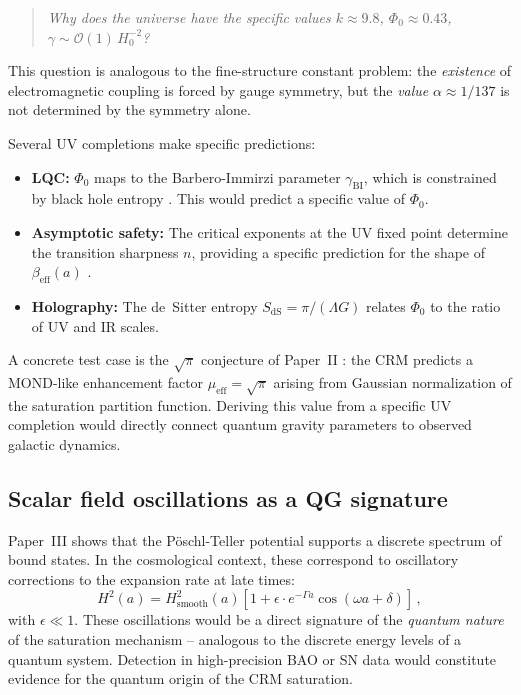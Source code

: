 \documentclass[aps,prd,twocolumn,superscriptaddress,nofootinbib]{revtex4-2}
\begin{document}
\begin{quote}
\textit{Why does the universe have the specific values $k \approx 9.8$, $\Phi_0 \approx 0.43$, $\gamma \sim \mathcal{O}(1)\,H_0^{-2}$?}
\end{quote}

This question is analogous to the fine-structure constant problem: the \textit{existence} of electromagnetic coupling is forced by gauge symmetry, but the \textit{value} $\alpha \approx 1/137$ is not determined by the symmetry alone.

Several UV completions make specific predictions:
\begin{itemize}
\item \textbf{LQC:} $\Phi_0$ maps to the Barbero-Immirzi parameter $\gamma_{\mathrm{BI}}$, which is constrained by black hole entropy \cite{Meissner2004}. This would predict a specific value of $\Phi_0$.
\item \textbf{Asymptotic safety:} The critical exponents at the UV fixed point determine the transition sharpness $n$, providing a specific prediction for the shape of $\beta_{\mathrm{eff}}(a)$ \cite{Reuter1998}.
\item \textbf{Holography:} The de~Sitter entropy $S_{\mathrm{dS}} = \pi/(\Lambda G)$ relates $\Phi_0$ to the ratio of UV and IR scales.
\end{itemize}

A concrete test case is the $\sqrt{\pi}$ conjecture of Paper~II \cite{Geiger2026b}: the CRM predicts a MOND-like enhancement factor $\mu_{\mathrm{eff}} = \sqrt{\pi}$ arising from Gaussian normalization of the saturation partition function. Deriving this value from a specific UV completion would directly connect quantum gravity parameters to observed galactic dynamics.

\subsection{Scalar field oscillations as a QG signature}

Paper~III \cite{Geiger2026c} shows that the P\"oschl-Teller potential supports a discrete spectrum of bound states. In the cosmological context, these correspond to oscillatory corrections to the expansion rate at late times:
\begin{equation}
H^2(a) = H_{\mathrm{smooth}}^2(a)\left[1 + \epsilon \cdot e^{-\Gamma a} \cos(\omega a + \delta)\right]\,,
\end{equation}
with $\epsilon \ll 1$. These oscillations would be a direct signature of the \textit{quantum nature} of the saturation mechanism -- analogous to the discrete energy levels of a quantum system. Detection in high-precision BAO or SN data would constitute evidence for the quantum origin of the CRM saturation.
\end{document}
